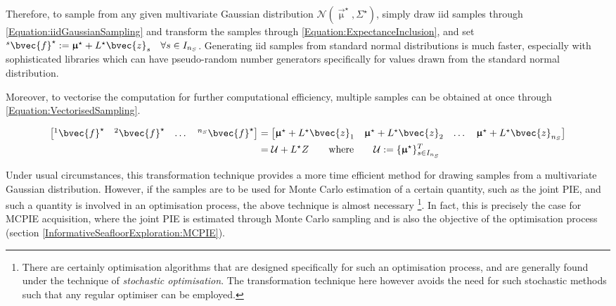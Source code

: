 			Therefore, to sample from any given multivariate Gaussian distribution $\mathcal{N}(\vec{\upmu}^{\star}, \Sigma^{\star})$, simply draw iid samples through \eqref{Equation:iidGaussianSampling} and transform the samples through \eqref{Equation:ExpectanceInclusion}, and set ${^{s}}\bvec{f}^{\star} := \vec{\upmu}^{\star} + L^{\star} \bvec{z}_{s} \quad \forall s \in I_{n_{S}}$. Generating iid samples from standard normal distributions is much faster, especially with sophisticated libraries which can have pseudo-random number generators specifically for values drawn from the standard normal distribution.
			
			Moreover, to vectorise the computation for further computational efficiency, multiple samples can be obtained at once through \eqref{Equation:VectorisedSampling}.
			
			\begin{equation}
				\begin{aligned}
					\begin{bmatrix} {^{1}}\bvec{f}^{\star} & {^{2}}\bvec{f}^{\star} & \dots & {^{n_{S}}}\bvec{f}^{\star} \end{bmatrix} &= \begin{bmatrix} \vec{\upmu}^{\star} + L^{\star} \bvec{z}_{1} & \vec{\upmu}^{\star} + L^{\star} \bvec{z}_{2} & \dots & \vec{\upmu}^{\star} + L^{\star} \bvec{z}_{n_{S}} \end{bmatrix} \\
					&= \mathcal{U} + L^{\star} Z \qquad \text{where} \qquad \mathcal{U} := \{\vec{\upmu}^{\star}\}^{T}_{s \in I_{n_{S}}}
				\end{aligned}
			\label{Equation:VectorisedSampling}
			\end{equation}			
			
			Under usual circumstances, this transformation technique provides a more time efficient method for drawing samples from a multivariate Gaussian distribution. However, if the samples are to be used for Monte Carlo estimation of a certain quantity, such as the joint PIE, and such a quantity is involved in an optimisation process, the above technique is almost necessary \footnote{There are certainly optimisation algorithms that are designed specifically for such an optimisation process, and are generally found under the technique of \textit{stochastic optimisation}. The transformation technique here however avoids the need for such stochastic methods such that any regular optimiser can be employed.}. In fact, this is precisely the case for MCPIE acquisition, where the joint PIE is estimated through Monte Carlo sampling and is also the objective of the optimisation process (section \ref{InformativeSeafloorExploration:MCPIE}).
			
